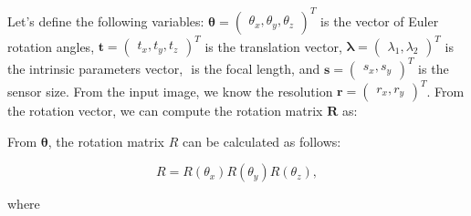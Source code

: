 Let's define the following variables: \(\boldsymbol{\theta} = \begin{pmatrix}
	\theta_x, \theta_y, \theta_z
\end{pmatrix}^{T}\) is the vector of Euler rotation angles, \(\mathbf{t} = \begin{pmatrix}
	t_x, t_y, t_z
\end{pmatrix}^{T}\) is the translation vector, \(\boldsymbol{\lambda} = \begin{pmatrix}
	\lambda_1, \lambda_2
\end{pmatrix}^{T}\) is the intrinsic parameters vector, \(\) is the focal
length, and \(\mathbf{s} = \begin{pmatrix}
	s_x, s_y
\end{pmatrix}^{T}\) is the sensor size.
From the input image, we know the resolution \(\mathbf{r} = \begin{pmatrix}
	r_x, r_y
\end{pmatrix}^{T}\).
From the rotation vector, we can compute the rotation matrix \(\mathbf{R}\) as:

From \(\boldsymbol{\theta}\), the rotation matrix $R$ can be calculated as follows:

\begin{equation}
	R = R(\theta_x) R(\theta_y) R(\theta_z),
\end{equation}

where

